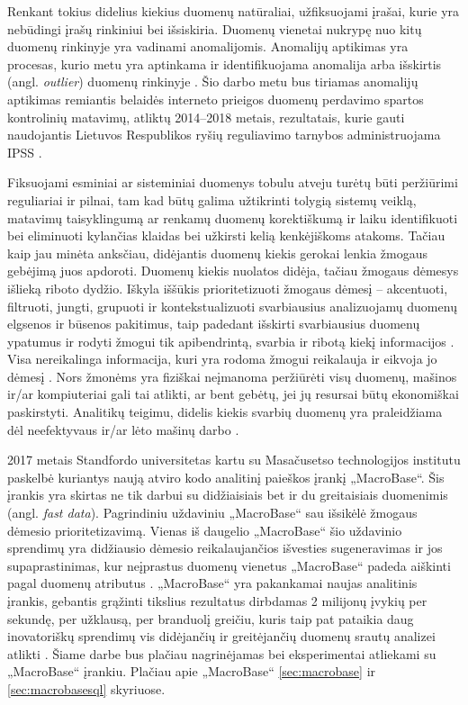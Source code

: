 \documentclass{VUMIFPSbakalaurinis}
\begin{document}
Renkant tokius didelius kiekius duomenų natūraliai, užfiksuojami įrašai, kurie yra nebūdingi įrašų rinkiniui bei išsiskiria. Duomenų vienetai nukrypę nuo kitų duomenų rinkinyje yra vadinami anomalijomis. Anomalijų aptikimas yra procesas, kurio metu yra aptinkama ir identifikuojama anomalija arba išskirtis (angl. \textit{outlier}) duomenų rinkinyje \cite{anomaly}. Šio darbo metu bus tiriamas anomalijų aptikimas remiantis belaidės interneto prieigos duomenų perdavimo spartos kontrolinių matavimų, atliktų 2014–2018 metais, rezultatais, kurie gauti naudojantis Lietuvos Respublikos ryšių reguliavimo tarnybos administruojama IPSS \cite{ipss}.\par

Fiksuojami esminiai ar sisteminiai duomenys tobulu atveju turėtų būti peržiūrimi reguliariai ir pilnai, tam kad būtų galima užtikrinti tolygią sistemų veiklą, matavimų taisyklingumą ar renkamų duomenų korektiškumą ir laiku identifikuoti bei eliminuoti kylančias klaidas bei užkirsti kelią kenkėjiškoms atakoms. Tačiau kaip jau minėta anksčiau, didėjantis duomenų kiekis gerokai lenkia žmogaus gebėjimą juos apdoroti. Duomenų kiekis nuolatos didėja, tačiau žmogaus dėmesys išlieką riboto dydžio. Iškyla iššūkis prioritetizuoti žmogaus dėmesį – akcentuoti, filtruoti, jungti, grupuoti ir kontekstualizuoti svarbiausius analizuojamų duomenų elgsenos ir būsenos pakitimus, taip padedant išskirti svarbiausius duomenų ypatumus ir rodyti žmogui tik apibendrintą, svarbia ir ribotą kiekį informacijos \cite{prioritizing_attention}. Visa nereikalinga informacija, kuri yra rodoma žmogui reikalauja ir eikvoja jo dėmesį \cite{attention}. Nors žmonėms yra fiziškai neįmanoma peržiūrėti visų duomenų, mašinos ir/ar kompiuteriai gali tai atlikti, ar bent gebėtų, jei jų resursai būtų ekonomiškai paskirstyti. Analitikų teigimu, didelis kiekis svarbių duomenų yra praleidžiama dėl neefektyvaus ir/ar lėto mašinų darbo \cite{prioritizing_attention}.\par

2017 metais Standfordo universitetas kartu su Masačusetso technologijos institutu paskelbė
kuriantys naują atviro kodo analitinį paieškos įrankį „MacroBase“. Šis įrankis yra skirtas ne tik darbui su didžiaisiais bet ir du greitaisiais duomenimis (angl. \textit{fast data}). Pagrindiniu uždaviniu „MacroBase“ sau išsikėlė žmogaus dėmesio prioritetizavimą. Vienas iš daugelio „MacroBase“ šio uždavinio sprendimų yra didžiausio dėmesio reikalaujančios išvesties sugeneravimas ir jos supaprastinimas, kur neįprastus duomenų vienetus „MacroBase“ padeda aiškinti pagal duomenų atributus \cite{macrobase_overview, prioritizing_attention, demonstration}. „MacroBase“ yra pakankamai naujas analitinis įrankis, gebantis grąžinti tikslius rezultatus dirbdamas 2 milijonų įvykių per sekundę, per užklausą, per branduolį greičiu, kuris taip pat pataikia daug inovatoriškų sprendimų vis didėjančių ir greitėjančių duomenų srautų analizei atlikti \cite{macrobase_overview}. Šiame darbe bus plačiau nagrinėjamas bei eksperimentai atliekami su „MacroBase“ įrankiu. Plačiau apie „MacroBase“ \ref{sec:macrobase} ir \ref{sec:macrobasesql} skyriuose.
\end{document}
